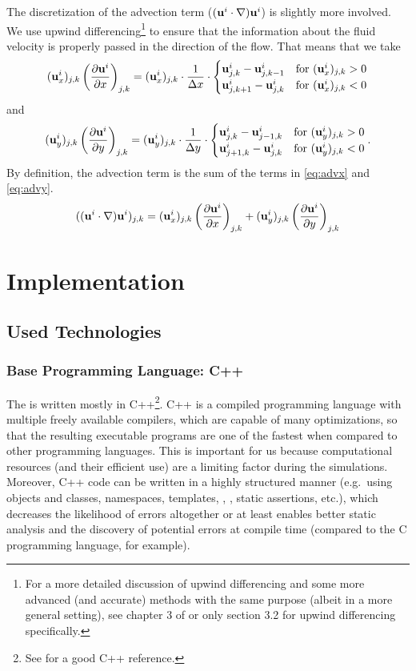 \documentclass[11pt,a4paper,twoside,openright]{report}
\begin{document}
The discretization of the advection term ($(\mathbf u^i\cdot\nabla)\mathbf u^i$) is slightly more involved. We use upwind differencing\footnote{For a more detailed discussion of upwind differencing and some more advanced (and accurate) methods with the same purpose (albeit in a more general setting), see chapter 3 of \cite{OsherFedkiw} or only section 3.2 for upwind differencing specifically.} to ensure that the information about the fluid velocity is properly passed in the direction of the flow. That means that we take
\begin{align}\label{eq:advx}
	(\mathbf u^i_x)_{j,k}\left(\frac{\partial \mathbf u^i}{\partial x}\right)_{j,k}=(\mathbf u^i_x)_{j,k}\cdot\frac1{\Delta x}\cdot\begin{cases}
		\mathbf u^i_{j,k}-\mathbf u^i_{j,k-1} & \text{for }(\mathbf u^i_x)_{j,k}>0\\
		\mathbf u^i_{j,k+1}-\mathbf u^i_{j,k} & \text{for }(\mathbf u^i_x)_{j,k}<0
	\end{cases}
\end{align}
and
\begin{align}\label{eq:advy}
	(\mathbf u^i_y)_{j,k}\left(\frac{\partial \mathbf u^i}{\partial y}\right)_{j,k}=(\mathbf u^i_y)_{j,k}\cdot\frac1{\Delta y}\cdot\begin{cases}
		\mathbf u^i_{j,k}-\mathbf u^i_{j-1,k} & \text{for }(\mathbf u^i_y)_{j,k}>0\\
		\mathbf u^i_{j+1,k}-\mathbf u^i_{j,k} & \text{for }(\mathbf u^i_y)_{j,k}<0
	\end{cases}.
\end{align}
By definition, the advection term is the sum of the terms in \eqref{eq:advx} and \eqref{eq:advy}.
\begin{align*}
	((\mathbf u^i\cdot\nabla)\mathbf u^i)_{j,k}=(\mathbf u^i_x)_{j,k}\left(\frac{\partial \mathbf u^i}{\partial x}\right)_{j,k}+(\mathbf u^i_y)_{j,k}\left(\frac{\partial \mathbf u^i}{\partial y}\right)_{j,k}
\end{align*}

\chapter{Implementation}

\section{Used Technologies}
\subsection{Base Programming Language: C++}
The \software{} is written mostly in C++\footnote{See \cite{cppreference} for a good C++ reference.}. C++ is a compiled programming language with multiple freely available compilers, which are capable of many optimizations, so that the resulting executable programs are one of the fastest when compared to other programming languages. This is important for us because computational resources (and their efficient use) are a limiting factor during the simulations. Moreover, C++ code can be written in a highly structured manner (e.g.\ using objects and classes, namespaces, templates, , , static assertions, etc.), which decreases the likelihood of errors altogether or at least enables better static analysis and the discovery of potential errors at compile time (compared to the C programming language, for example). 
\end{document}
